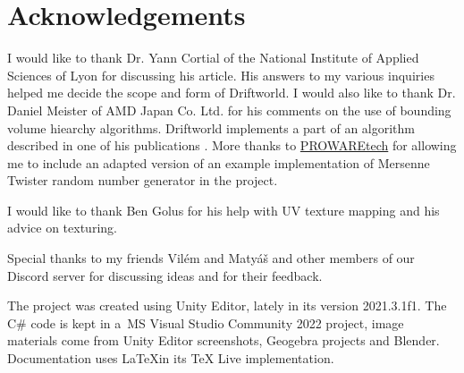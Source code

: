 \section*{Acknowledgements}

I would like to thank Dr. Yann Cortial of the National Institute of Applied Sciences of Lyon for discussing his article. His answers to my various inquiries helped me decide the scope and form of Driftworld. I would also like to thank Dr. Daniel Meister of AMD Japan Co. Ltd. for his comments on the use of bounding volume hiearchy algorithms. Driftworld implements a part of an algorithm described in one of his publications \cite{meister}. More thanks to \href{https://www.prowaretech.com}{PROWAREtech} for allowing me to include an adapted version of an example implementation of Mersenne Twister random number generator in the project.

I would like to thank Ben Golus for his help with UV texture mapping and his advice on texturing. %

Special thanks to my friends Vilém and Matyáš and other members of our Discord server for discussing ideas and for their feedback.

The project was created using Unity Editor, lately in its version 2021.3.1f1. The C\# code is kept in a~MS Visual Studio Community 2022 project, image materials come from Unity Editor screenshots, Geogebra projects and Blender. Documentation uses \LaTeX\hspace*{0.3em}in its TeX Live implementation.